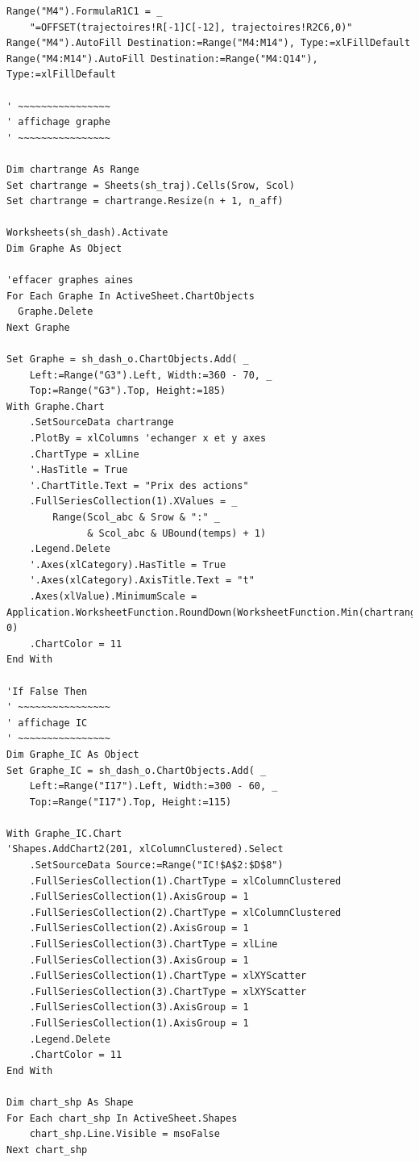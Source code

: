 \documentclass[a4paper,12pt]{scrartcl}
\begin{document}
\begin{lstlisting}
Range("M4").FormulaR1C1 = _
    "=OFFSET(trajectoires!R[-1]C[-12], trajectoires!R2C6,0)"
Range("M4").AutoFill Destination:=Range("M4:M14"), Type:=xlFillDefault
Range("M4:M14").AutoFill Destination:=Range("M4:Q14"), Type:=xlFillDefault

' ~~~~~~~~~~~~~~~~
' affichage graphe
' ~~~~~~~~~~~~~~~~

Dim chartrange As Range
Set chartrange = Sheets(sh_traj).Cells(Srow, Scol)
Set chartrange = chartrange.Resize(n + 1, n_aff)

Worksheets(sh_dash).Activate
Dim Graphe As Object

'effacer graphes aines
For Each Graphe In ActiveSheet.ChartObjects
  Graphe.Delete
Next Graphe

Set Graphe = sh_dash_o.ChartObjects.Add( _
    Left:=Range("G3").Left, Width:=360 - 70, _
    Top:=Range("G3").Top, Height:=185)
With Graphe.Chart
    .SetSourceData chartrange
    .PlotBy = xlColumns 'echanger x et y axes
    .ChartType = xlLine
    '.HasTitle = True
    '.ChartTitle.Text = "Prix des actions"
    .FullSeriesCollection(1).XValues = _
        Range(Scol_abc & Srow & ":" _
              & Scol_abc & UBound(temps) + 1)
    .Legend.Delete
    '.Axes(xlCategory).HasTitle = True
    '.Axes(xlCategory).AxisTitle.Text = "t"
    .Axes(xlValue).MinimumScale = Application.WorksheetFunction.RoundDown(WorksheetFunction.Min(chartrange), 0)
    .ChartColor = 11
End With

'If False Then
' ~~~~~~~~~~~~~~~~
' affichage IC
' ~~~~~~~~~~~~~~~~
Dim Graphe_IC As Object
Set Graphe_IC = sh_dash_o.ChartObjects.Add( _
    Left:=Range("I17").Left, Width:=300 - 60, _
    Top:=Range("I17").Top, Height:=115)

With Graphe_IC.Chart
'Shapes.AddChart2(201, xlColumnClustered).Select
    .SetSourceData Source:=Range("IC!$A$2:$D$8")
    .FullSeriesCollection(1).ChartType = xlColumnClustered
    .FullSeriesCollection(1).AxisGroup = 1
    .FullSeriesCollection(2).ChartType = xlColumnClustered
    .FullSeriesCollection(2).AxisGroup = 1
    .FullSeriesCollection(3).ChartType = xlLine
    .FullSeriesCollection(3).AxisGroup = 1
    .FullSeriesCollection(1).ChartType = xlXYScatter
    .FullSeriesCollection(3).ChartType = xlXYScatter
    .FullSeriesCollection(3).AxisGroup = 1
    .FullSeriesCollection(1).AxisGroup = 1
    .Legend.Delete
    .ChartColor = 11
End With

Dim chart_shp As Shape
For Each chart_shp In ActiveSheet.Shapes
    chart_shp.Line.Visible = msoFalse
Next chart_shp


\end{lstlisting}
\end{document}
